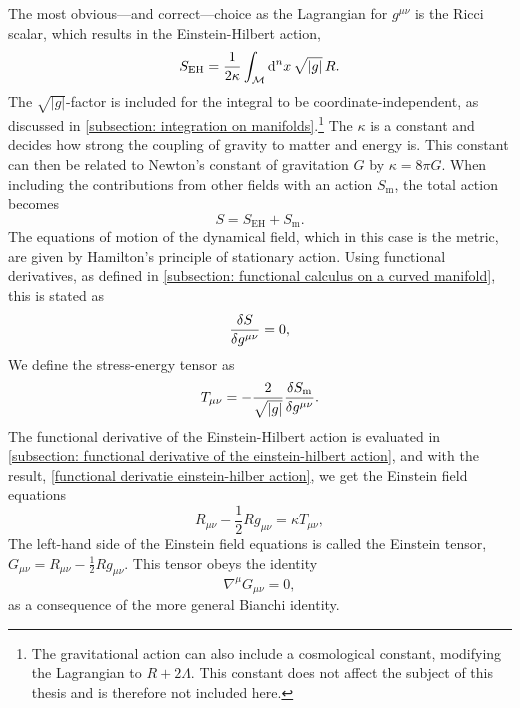 The most obvious---and correct---choice as the Lagrangian for $g^{\mu \nu}$ is the Ricci scalar, which results in the Einstein-Hilbert action,
%
\begin{equation}
    \label{Einstein-Hilbert action}
    S_{\text{EH}} = \frac{1}{2\kappa}\int_{\mathcal{M}} \dd^n x \, \sqrt{|g|}\, R.
\end{equation}
%
The $\sqrt{|g|}$-factor is included for the integral to be coordinate-independent, as discussed in  \autoref{subsection: integration on manifolds}.\footnote{The gravitational action can also include a cosmological constant, modifying the Lagrangian to $R + 2 \Lambda$. This constant does not affect the subject of this thesis and is therefore not included here.}
The $\kappa$ is a constant and decides how strong the coupling of gravity to matter and energy is.
This constant can then be related to Newton's constant of gravitation $G$ by $\kappa = 8 \pi G$.
When including the contributions from other fields with an action $S_\text{m}$, the total action becomes 
%
\begin{equation}
    S = S_\text{EH} + S_\text{m}.
\end{equation}
%
The equations of motion of the dynamical field, which in this case is the metric, are given by Hamilton's principle of stationary action.
Using functional derivatives, as defined in \autoref{subsection: functional calculus on a curved manifold}, this is stated as
%
\begin{equation}
    \fdv{S}{g^{\mu\nu}} = 0,
\end{equation}
%
We define the stress-energy tensor as
%
\begin{equation}
    \label{definition stress energy densor}
    T_{\mu\nu} = - \frac{2}{\sqrt{|g|}} \fdv{S_\text{m}}{g^{\mu \nu}}.
\end{equation}
%
The functional derivative of the Einstein-Hilbert action is evaluated in \autoref{subsection: functional derivative of the einstein-hilbert action}, and with the result, \autoref{functional derivatie einstein-hilber action}, we get the Einstein field equations
%
\begin{equation}
    \label{Einstein field equations}
    R_{\mu \nu} - \frac{1}{2} R g_{\mu \nu} = \kappa T_{\mu \nu},
\end{equation}
%
The left-hand side of the Einstein field equations is called the Einstein tensor, $G_{\mu \nu} = R_{\mu \nu} - \frac{1}{2} R g_{\mu \nu}$. This tensor obeys the identity
\begin{equation}
    \label{Einstein tensor bianchi identity}
    \nabla^\mu G_{\mu \nu} = 0,
\end{equation}
as a consequence of the more general Bianchi identity.


